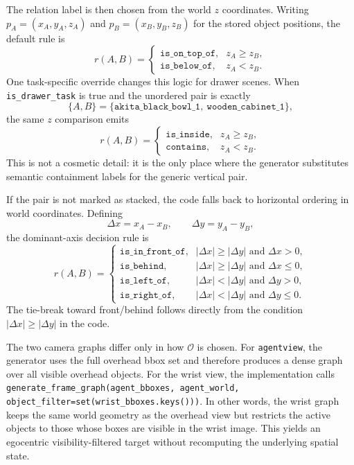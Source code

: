 \documentclass{article}
\begin{document}
The relation label is then chosen from the world $z$ coordinates. Writing $p_A=(x_A,y_A,z_A)$ and $p_B=(x_B,y_B,z_B)$ for the stored object positions, the default rule is
\begin{equation}
r(A,B)=
\begin{cases}
\texttt{is\_on\_top\_of}, & z_A \ge z_B, \\
\texttt{is\_below\_of}, & z_A < z_B.
\end{cases}
\end{equation}
One task-specific override changes this logic for drawer scenes. When \texttt{is\_drawer\_task} is true and the unordered pair is exactly
\begin{equation}
\{A,B\} = \{\texttt{akita\_black\_bowl\_1},\ \texttt{wooden\_cabinet\_1}\},
\end{equation}
the same $z$ comparison emits
\begin{equation}
r(A,B)=
\begin{cases}
\texttt{is\_inside}, & z_A \ge z_B, \\
\texttt{contains}, & z_A < z_B.
\end{cases}
\end{equation}
This is not a cosmetic detail: it is the only place where the generator substitutes semantic containment labels for the generic vertical pair.

If the pair is not marked as stacked, the code falls back to horizontal ordering in world coordinates. Defining
\begin{equation}
\Delta x = x_A - x_B,
\qquad
\Delta y = y_A - y_B,
\end{equation}
the dominant-axis decision rule is
\begin{equation}
r(A,B)=
\begin{cases}
\texttt{is\_in\_front\_of}, & |\Delta x| \ge |\Delta y| \text{ and } \Delta x > 0, \\
\texttt{is\_behind}, & |\Delta x| \ge |\Delta y| \text{ and } \Delta x \le 0, \\
\texttt{is\_left\_of}, & |\Delta x| < |\Delta y| \text{ and } \Delta y > 0, \\
\texttt{is\_right\_of}, & |\Delta x| < |\Delta y| \text{ and } \Delta y \le 0.
\end{cases}
\end{equation}
The tie-break toward front/behind follows directly from the condition $|\Delta x| \ge |\Delta y|$ in the code.

The two camera graphs differ only in how $\mathcal{O}$ is chosen. For \texttt{agentview}, the generator uses the full overhead bbox set and therefore produces a dense graph over all visible overhead objects. For the wrist view, the implementation calls \texttt{generate\_frame\_graph(agent\_bboxes, agent\_world, object\_filter=set(wrist\_bboxes.keys()))}. In other words, the wrist graph keeps the same world geometry as the overhead view but restricts the active objects to those whose boxes are visible in the wrist image. This yields an egocentric visibility-filtered target without recomputing the underlying spatial state.
\end{document}
